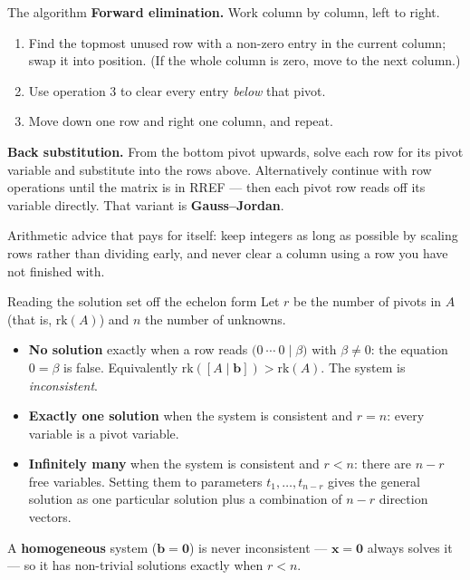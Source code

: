 \begin{rulebox}{The algorithm}
\textbf{Forward elimination.} Work column by column, left to right.
\begin{enumerate}[leftmargin=1.8em,itemsep=0.2ex]
  \item Find the topmost unused row with a non-zero entry in the current
        column; swap it into position. (If the whole column is zero, move
        to the next column.)
  \item Use operation 3 to clear every entry \emph{below} that pivot.
  \item Move down one row and right one column, and repeat.
\end{enumerate}
\textbf{Back substitution.} From the bottom pivot upwards, solve each row
for its pivot variable and substitute into the rows above. Alternatively
continue with row operations until the matrix is in RREF --- then each
pivot row reads off its variable directly. That variant is
\textbf{Gauss--Jordan}.

Arithmetic advice that pays for itself: keep integers as long as possible
by scaling rows rather than dividing early, and never clear a column using
a row you have not finished with.
\end{rulebox}

\begin{rulebox}{Reading the solution set off the echelon form}
Let $r$ be the number of pivots in $A$ (that is, $\mathrm{rk}(A)$) and $n$
the number of unknowns.
\begin{itemize}[leftmargin=1.6em,itemsep=0.35ex]
  \item \textbf{No solution} exactly when a row reads
        $\bigl(0\ \cdots\ 0 \mid \beta\bigr)$ with $\beta\neq0$: the
        equation $0=\beta$ is false. Equivalently
        $\mathrm{rk}([A\mid\mathbf{b}])>\mathrm{rk}(A)$. The system is
        \emph{inconsistent}.
  \item \textbf{Exactly one solution} when the system is consistent and
        $r=n$: every variable is a pivot variable.
  \item \textbf{Infinitely many} when the system is consistent and $r<n$:
        there are $n-r$ free variables. Setting them to parameters
        $t_{1},\dots,t_{n-r}$ gives the general solution as one particular
        solution plus a combination of $n-r$ direction vectors.
\end{itemize}
A \textbf{homogeneous} system ($\mathbf{b}=\mathbf{0}$) is never
inconsistent --- $\mathbf{x}=\mathbf{0}$ always solves it --- so it has
non-trivial solutions exactly when $r<n$.
\end{rulebox}

